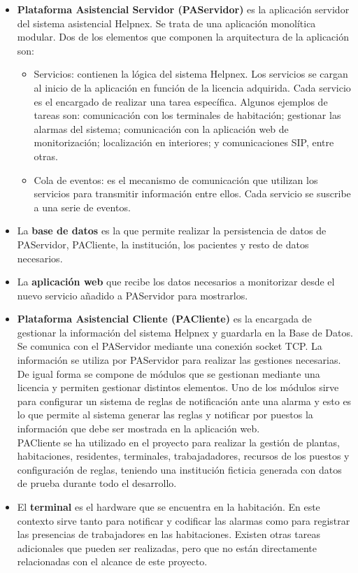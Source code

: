\begin{itemize}
	\item \textbf{Plataforma Asistencial Servidor (PAServidor)} es la aplicación servidor del sistema asistencial Helpnex. Se trata de una aplicación monolítica modular. Dos de los elementos que componen la arquitectura de la aplicación son:
	\begin{itemize}
		\item Servicios: contienen la lógica del sistema Helpnex. Los servicios se cargan al inicio de la aplicación en función de la licencia adquirida. Cada servicio es el encargado de realizar una tarea específica. Algunos ejemplos de tareas son: comunicación con los terminales de habitación; gestionar las alarmas del sistema; comunicación con la aplicación web de monitorización; localización en interiores; y comunicaciones SIP, entre otras.
		\item Cola de eventos: es el mecanismo de comunicación que utilizan los servicios para transmitir información entre ellos. Cada servicio se suscribe a una serie de eventos.
	\end{itemize}
	\item La \textbf{base de datos} es la que permite realizar la persistencia de datos de PAServidor, PACliente, la institución, los pacientes y resto de datos necesarios.
	\item La \textbf{aplicación web} que recibe los datos necesarios a monitorizar desde el nuevo servicio añadido a PAServidor para mostrarlos.
	\item \textbf{Plataforma Asistencial Cliente (PACliente)} es la encargada de gestionar la información del sistema Helpnex y guardarla en la Base de Datos. Se comunica con el PAServidor mediante una conexión socket TCP. La información se utiliza por PAServidor para realizar las gestiones necesarias. De igual forma se compone de módulos que se gestionan mediante una licencia y permiten gestionar distintos elementos. Uno de los módulos sirve para configurar un sistema de reglas de notificación ante una alarma y esto es lo que permite al sistema generar las reglas y notificar por puestos la información que debe ser mostrada en la aplicación web.\\
	PACliente se ha utilizado en el proyecto  para realizar la gestión de plantas, habitaciones, residentes, terminales, trabajadadores, recursos de los puestos y configuración de reglas, teniendo una institución ficticia generada con datos de prueba durante todo el desarrollo.
	\item El \textbf{terminal} es el hardware que se encuentra en la habitación. En este contexto sirve tanto para notificar y codificar las alarmas como para registrar las presencias de trabajadores en las habitaciones. Existen otras tareas adicionales que pueden ser realizadas, pero que no están directamente relacionadas con el alcance de este proyecto.
\end{itemize}

